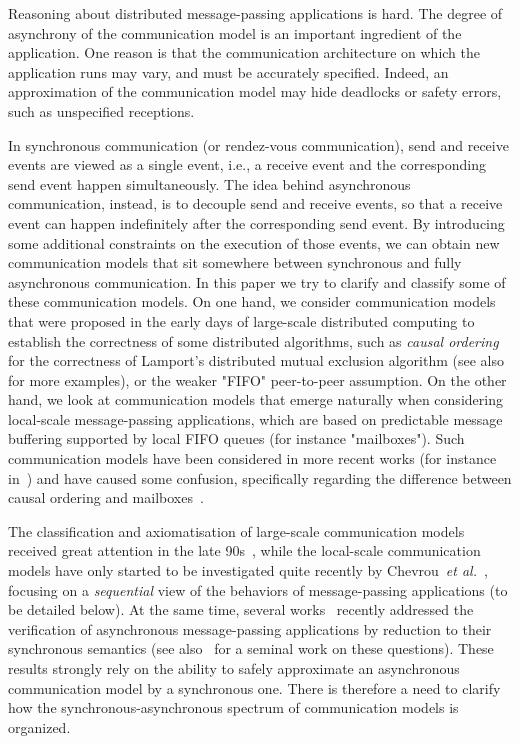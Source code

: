 
Reasoning about distributed message-passing applications is  hard. The degree of asynchrony
of the communication model is  an important ingredient of the application.
One reason
is that the communication architecture on which the application runs may vary, and must be accurately specified. 
Indeed, an approximation of the communication model may hide deadlocks or safety errors,
such as unspecified receptions.

In synchronous communication (or rendez-vous communication), send and receive events are viewed as
a single event, i.e., a receive event and the corresponding send event happen simultaneously. The idea behind asynchronous communication, instead, is to decouple send and receive events, so that a receive event can happen indefinitely after the corresponding send event. By introducing some additional constraints on the execution of those events, we can obtain new communication models that sit somewhere between synchronous and fully asynchronous communication.
In this paper we try to clarify and classify some of these communication models.
On  one hand, we consider communication models that were proposed in the early days of large-scale distributed computing to establish the correctness of some distributed algorithms, such as \emph{causal ordering}~\cite{Lamport78} for the correctness of Lamport's distributed mutual exclusion algorithm (see also~\cite{Renesse93} for more examples), or the weaker "FIFO" peer-to-peer assumption. On the other hand, we look at communication models that emerge
naturally when considering local-scale message-passing applications, which are based on predictable
message buffering supported by local FIFO queues (for instance "mailboxes"). Such communication models have
been considered in more recent works (for instance in~\cite{DBLP:journals/tcs/BasuB16}) and have caused
some confusion, specifically regarding the difference between causal ordering and mailboxes~\cite{DBLP:conf/cav/BouajjaniEJQ18,DBLP:conf/fossacs/GiustoLL20}.

The classification and axiomatisation of large-scale communication models received great attention in the late 90s~\cite{DBLP:journals/dc/Charron-BostMT96}, while the local-scale communication models have only started to be investigated quite recently by Chevrou~\emph{et al.}~\cite{DBLP:journals/fac/ChevrouHQ16}, focusing on a \emph{sequential} view of the behaviors of message-passing
applications (to be detailed below).
At the same time, several works~\cite{KraglQH18,GleissenthallKB19,DBLP:conf/cav/BouajjaniEJQ18,DBLP:conf/cav/LangeY19} recently addressed the verification of
asynchronous message-passing applications by reduction to their synchronous semantics (see also~\cite{Lipton75} for a seminal work on these questions). These results strongly rely on the ability to safely approximate an asynchronous communication model by a synchronous one. There is therefore a need to clarify how the synchronous-asynchronous spectrum of communication models is organized.

